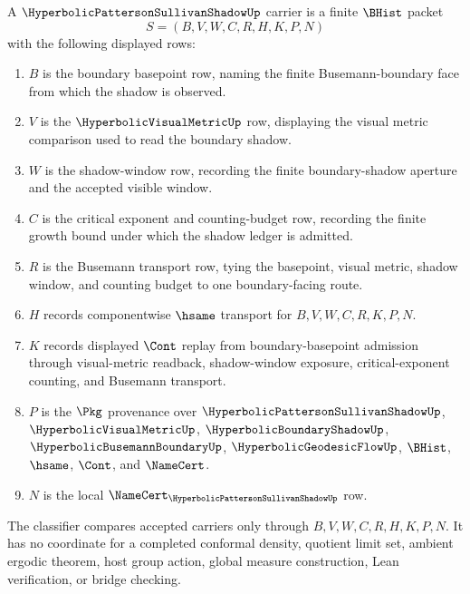 \begin{definition}
\label{def:hyperbolic-patterson-sullivan-shadow-carrier}
A $\HyperbolicPattersonSullivanShadowUp$ carrier is a finite $\BHist$ packet
$$
S=(B,V,W,C,R,H,K,P,N)
$$
with the following displayed rows:
\begin{enumerate}
\item $B$ is the boundary basepoint row, naming the finite Busemann-boundary face from which the shadow is observed.
\item $V$ is the $\HyperbolicVisualMetricUp$ row, displaying the visual metric comparison used to read the boundary shadow.
\item $W$ is the shadow-window row, recording the finite boundary-shadow aperture and the accepted visible window.
\item $C$ is the critical exponent and counting-budget row, recording the finite growth bound under which the shadow ledger is admitted.
\item $R$ is the Busemann transport row, tying the basepoint, visual metric, shadow window, and counting budget to one boundary-facing route.
\item $H$ records componentwise $\hsame$ transport for $B,V,W,C,R,K,P,N$.
\item $K$ records displayed $\Cont$ replay from boundary-basepoint admission through visual-metric readback, shadow-window exposure, critical-exponent counting, and Busemann transport.
\item $P$ is the $\Pkg$ provenance over $\HyperbolicPattersonSullivanShadowUp$, $\HyperbolicVisualMetricUp$, $\HyperbolicBoundaryShadowUp$, $\HyperbolicBusemannBoundaryUp$, $\HyperbolicGeodesicFlowUp$, $\BHist$, $\hsame$, $\Cont$, and $\NameCert$.
\item $N$ is the local $\NameCert_{\HyperbolicPattersonSullivanShadowUp}$ row.
\end{enumerate}
The classifier compares accepted carriers only through $B,V,W,C,R,H,K,P,N$. It has no coordinate for a completed conformal density, quotient limit set, ambient ergodic theorem, host group action, global measure construction, Lean verification, or bridge checking.
\end{definition}

